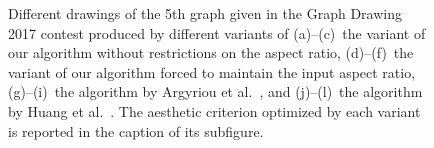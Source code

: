 \documentclass[runningheads]{llncs}
\begin{document}
{\begin{figure}[htbp]
\caption{Different drawings of the 5th graph given in the Graph Drawing 2017 contest produced by different variants of
(a)--(c)~the variant of our algorithm without restrictions on the aspect ratio, 
(d)--(f)~the variant of our algorithm forced to maintain the input aspect ratio,
(g)--(i)~the algorithm by Argyriou et al.~\cite{DBLP:journals/cj/ArgyriouBS13}, and
(j)--(l)~the algorithm by Huang et al.~\cite{DBLP:journals/vlc/HuangEHL13}.
The aesthetic criterion optimized by each variant is reported in the caption of its subfigure.}
\label{fig:graph5}
\end{figure}

\begin{figure}[htbp]
\centering
{}
\hfill
{}
\hfill
{}


\end{figure}}
\end{document}
